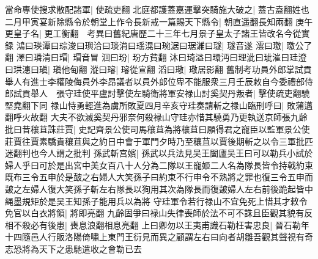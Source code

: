 當命專使搜求散配諸軍|{
	使疏吏翻}
北庭都護蓋嘉運擊突騎施大破之|{
	蓋古盍翻姓也}
二月甲寅宴新除縣令於朝堂上作令長新戒一篇賜天下縣令|{
	朝直遥翻長知兩翻}
庚午更皇子名|{
	更工衡翻　考異曰舊紀唐歷二十三年七月景子皇太子諸王皆改名今從實録}
鴻曰瑛潭曰琮浚曰璵洽曰琰㳙曰瑶滉曰琬涺曰琚濰曰璲|{
	璲音遂}
澐曰璬|{
	璬公了翻}
澤曰璘清曰瑁|{
	瑁音冒}
洄曰玢|{
	玢方貧翻}
沐曰琦溢曰環沔曰理泚曰玼漼曰珪澄曰珙潓曰瑱|{
	瑱他甸翻}
漎曰璿|{
	璿從宣翻}
滔曰璥|{
	璥居影翻}
舊制考功員外郎掌試貢舉人有進士李權陵侮員外李昂議者以員外郎位卑不能服衆三月壬辰敕自今委禮部侍郎試貢舉人　張守珪使平盧討擊使左騎衛將軍安禄山討奚契丹叛者|{
	擊使疏吏翻驍堅堯翻下同}
禄山恃勇輕進為虜所敗夏四月辛亥守珪奏請斬之禄山臨刑呼曰|{
	敗蒲邁翻呼火故翻}
大夫不欲滅奚契丹邪奈何殺禄山守珪亦惜其驍勇乃更執送京師張九齡批曰昔穰苴誅莊賈|{
	史記齊景公使司馬穰苴為將穰苴曰願得君之寵臣以監軍景公使莊賈往賈素驕貴穰苴與之約日中會于軍門夕時乃至穰苴以賈後期斬之以令三軍批匹迷翻判也今人謂之批判}
孫武斬宫嬪|{
	孫武以兵法見吴王闔廬吴王曰可以勒兵小試於婦人乎曰可於是出宮中美女百八十人分為二隊以王寵姬二人名為隊長皆令持戟約束既布三令五申於是皷之右婦人大笑孫子曰約束不行申令不熟將之罪也復三令五申而皷之左婦人復大笑孫子斬左右隊長以狥用其次為隊長而復皷婦人左右前後跪起皆中䋲墨規矩於是吴王知孫子能用兵以為將}
守珪軍令若行禄山不宜免死上惜其才敕令免官以白衣將領|{
	將即亮翻}
九齡固爭曰禄山失律喪師於法不可不誅且臣觀其貌有反相不殺必有後患|{
	喪息浪翻相息亮翻}
上曰卿勿以王夷甫識石勒枉害忠良|{
	晉石勒年十四隨邑人行販洛陽倚嘯上東門王衍見而異之顧謂左右曰向者胡雛吾觀其聲視有奇志恐將為天下之患馳遣收之會勒已去}
